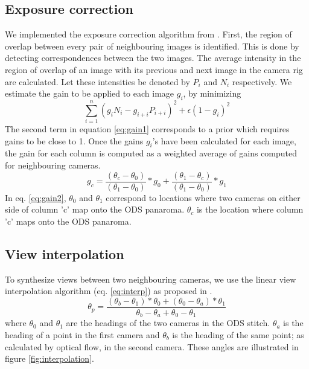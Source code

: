 \documentclass[10pt,twocolumn,letterpaper]{article}
\begin{document}
\subsection{Exposure correction}
We implemented the exposure correction algorithm from \cite{jump16}. First, the region of overlap between every pair of neighbouring images is identified. This is done by detecting correspondences between the two images. The average intensity in the region of overlap of an image with its previous and next image in the camera rig are calculated. Let these intensities be denoted by $P_i$ and $N_i$ respectively. We estimate the gain to be applied to each image $g_i$, by minimizing 
\begin{equation}
\sum_{i=1}^{n}(g_{i}N_{i} - g_{i+i}P_{i+i})^2 + \epsilon(1-g_{i})^2
\label{eq:gain1}
\end{equation}
The second term in equation \ref{eq:gain1} corresponds to a prior which requires gains to be close to 1. Once the gains $g_i$'s have been calculated for each image, the gain for each column is computed as a weighted average of gains computed for neighbouring cameras. 
\begin{equation}
g_{c}=\dfrac{(\theta_{c}-\theta_{0})}{(\theta_1-\theta_{0})}*g_{0} + \dfrac{(\theta_{1}-\theta_{c})}{(\theta_1-\theta_{0})}*g_{1}
\label{eq:gain2}
\end{equation}
In eq. \ref{eq:gain2}, $\theta_0$ and $\theta_1$ correspond to locations where two cameras on either side of column 'c' map onto the ODS panaroma. $\theta_c$ is the location where column 'c' maps onto the ODS panaroma.

\subsection{View interpolation}
\label{sec:viewinterp}
To synthesize views between two neighbouring cameras, we use the linear view interpolation algorithm (eq. \ref{eq:interp}) as proposed  in \cite{jump16}.
\begin{equation}
\theta_p=\dfrac{(\theta_{b}-\theta_{1})*\theta_{0}+(\theta_{0}-\theta_{a})*\theta_{1}}{\theta_{b}-\theta_{a}+\theta_{0}-\theta_{1}}
\label{eq:interp}
\end{equation}
where $\theta_{0}$ and $\theta_ {1}$ are the headings of the two cameras in the ODS stitch. $\theta_ {a}$ is the heading of a point in the first camera and $\theta_ {b}$ is the heading of the same point; as calculated by optical flow, in the second camera. These angles are illustrated in figure \ref{fig:interpolation}.
\end{document}
